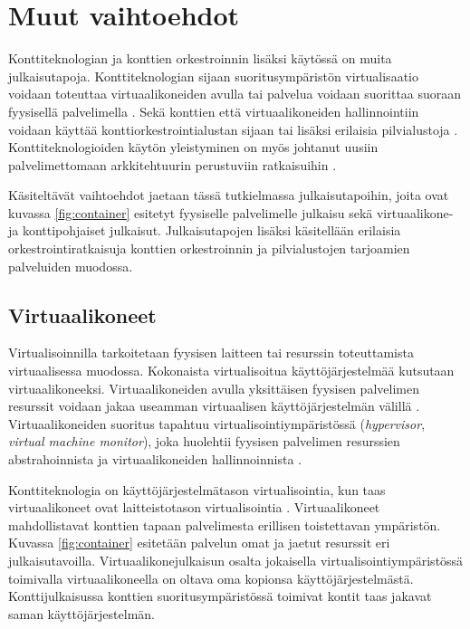 \chapter{Muut vaihtoehdot\label{options}}

Konttiteknologian ja konttien orkestroinnin lisäksi käytössä on muita julkaisutapoja. Konttiteknologian sijaan suoritusympäristön virtualisaatio voidaan toteuttaa virtuaalikoneiden avulla tai palvelua voidaan suorittaa suoraan fyysisellä palvelimella \cite{Watada19}.
Sekä konttien että virtuaalikoneiden hallinnointiin voidaan käyttää konttiorkestrointialustan sijaan tai lisäksi erilaisia pilvialustoja \cite{Bousselmi14}.
Konttiteknologioiden käytön yleistyminen on myös johtanut uusiin palvelimettomaan arkkitehtuurin perustuviin ratkaisuihin \cite{Baldini17}.

Käsiteltävät vaihtoehdot jaetaan tässä tutkielmassa julkaisutapoihin, joita ovat kuvassa \ref{fig:container} esitetyt fyysiselle palvelimelle julkaisu sekä virtuaalikone- ja konttipohjaiset julkaisut.
Julkaisutapojen lisäksi käsitellään erilaisia orkestrointiratkaisuja konttien orkestroinnin ja pilvialustojen tarjoamien palveluiden muodossa.

\section{Virtuaalikoneet}

Virtualisoinnilla tarkoitetaan fyysisen laitteen tai resurssin toteuttamista virtuaalisessa muodossa.
Kokonaista virtualisoitua käyttöjärjestelmää kutsutaan virtuaalikoneeksi.
Virtuaalikoneiden avulla yksittäisen fyysisen palvelimen resurssit voidaan jakaa useamman virtuaalisen käyttöjärjestelmän välillä \cite{Smith05}.
Virtuaalikoneiden suoritus tapahtuu virtualisointiympäristössä (\textit{hypervisor}, \textit{virtual machine monitor}), joka huolehtii fyysisen palvelimen resurssien abstrahoinnista ja virtuaalikoneiden hallinnoinnista \cite{desai13}.

Konttiteknologia on käyttöjärjestelmätason virtualisointia, kun taas virtuaalikoneet ovat laitteistotason virtualisointia \cite{Compastie20}.
Virtuaalikoneet mahdollistavat konttien tapaan palvelimesta erillisen toistettavan ympäristön.
Kuvassa \ref{fig:container} esitetään palvelun omat ja jaetut resurssit eri julkaisutavoilla.
Virtuaalikonejulkaisun osalta jokaisella virtualisointiympäristössä toimivalla virtuaalikoneella on oltava oma kopionsa käyttöjärjestelmästä.
Konttijulkaisussa konttien suoritusympäristössä toimivat kontit taas jakavat saman käyttöjärjestelmän.

